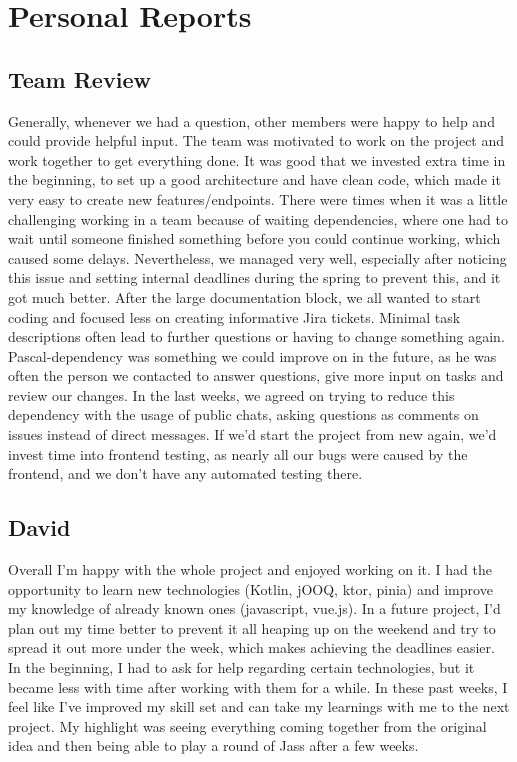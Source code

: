 \chapter{Personal Reports}

\section{Team Review}
Generally, whenever we had a question, other members were happy to help and could provide helpful input.
The team was motivated to work on the project and work together to get everything done.
It was good that we invested extra time in the beginning, to set up a good architecture and have clean code, which made it very easy to create new features/endpoints.
There were times when it was a little challenging working in a team because of waiting dependencies, where one had to wait until someone finished something before you could continue working, which caused some delays.
Nevertheless, we managed very well, especially after noticing this issue and setting internal deadlines during the spring to prevent this, and it got much better.
After the large documentation block, we all wanted to start coding and focused less on creating informative Jira tickets.
Minimal task descriptions often lead to further questions or having to change something again.
Pascal-dependency was something we could improve on in the future, as he was often the person we contacted to answer questions, give more input on tasks and review our changes.
In the last weeks, we agreed on trying to reduce this dependency with the usage of public chats, asking questions as comments on issues instead of direct messages.
If we'd start the project from new again, we'd invest time into frontend testing, as nearly all our bugs were caused by the frontend, and we don't have any automated testing there.

\section{David}
Overall I'm happy with the whole project and enjoyed working on it.
I had the opportunity to learn new technologies (Kotlin, jOOQ, ktor, pinia) and improve my knowledge of already known ones (javascript, vue.js).
In a future project, I'd plan out my time better to prevent it all heaping up on the weekend and try to spread it out more under the week, which makes achieving the deadlines easier.
In the beginning, I had to ask for help regarding certain technologies, but it became less with time after working with them for a while.
In these past weeks, I feel like I've improved my skill set and can take my learnings with me to the next project.
My highlight was seeing everything coming together from the original idea and then being able to play a round of Jass after a few weeks.

